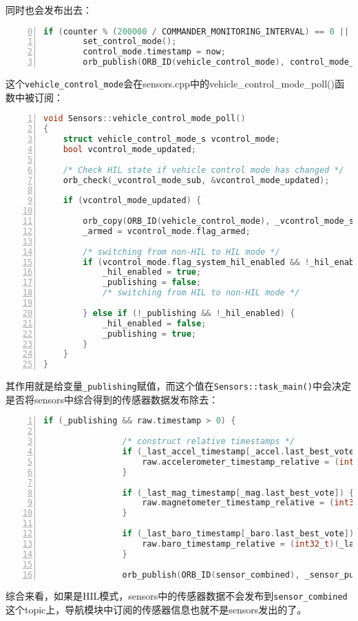 同时也会发布出去：
\begin{lstlisting}[language=C++,numbers=left,firstnumber = 0,breaklines = true,numberstyle=\tiny,keywordstyle=\color{blue!70},commentstyle=\color{red!50!green!50!blue!50},frame=shadowbox, rulesepcolor=\color{red!20!green!20!blue!20}]
	if (counter % (200000 / COMMANDER_MONITORING_INTERVAL) == 0 || status_changed) {
		set_control_mode();
		control_mode.timestamp = now;
		orb_publish(ORB_ID(vehicle_control_mode), control_mode_pub, &control_mode);
\end{lstlisting}
这个\texttt{vehicle_control_mode}会在sensors.cpp中的vehicle_control_mode_poll()函数中被订阅：
\begin{lstlisting}[language=C++,numbers=left,firstnumber = 1,breaklines = true,numberstyle=\tiny,keywordstyle=\color{blue!70},commentstyle=\color{red!50!green!50!blue!50},frame=shadowbox, rulesepcolor=\color{red!20!green!20!blue!20}]
void Sensors::vehicle_control_mode_poll()
{
	struct vehicle_control_mode_s vcontrol_mode;
	bool vcontrol_mode_updated;

	/* Check HIL state if vehicle control mode has changed */
	orb_check(_vcontrol_mode_sub, &vcontrol_mode_updated);

	if (vcontrol_mode_updated) {

		orb_copy(ORB_ID(vehicle_control_mode), _vcontrol_mode_sub, &vcontrol_mode);
		_armed = vcontrol_mode.flag_armed;

		/* switching from non-HIL to HIL mode */
		if (vcontrol_mode.flag_system_hil_enabled && !_hil_enabled) {
			_hil_enabled = true;
			_publishing = false;
			/* switching from HIL to non-HIL mode */

		} else if (!_publishing && !_hil_enabled) {
			_hil_enabled = false;
			_publishing = true;
		}
	}
}
\end{lstlisting}
其作用就是给变量\texttt{_publishing}赋值，而这个值在\texttt{Sensors::task_main()}中会决定是否将sensors中综合得到的传感器数据发布除去：
\begin{lstlisting}[language=C++,numbers=left,firstnumber = 1,breaklines = true,numberstyle=\tiny,keywordstyle=\color{blue!70},commentstyle=\color{red!50!green!50!blue!50},frame=shadowbox, rulesepcolor=\color{red!20!green!20!blue!20}]
if (_publishing && raw.timestamp > 0) {
	
				/* construct relative timestamps */
				if (_last_accel_timestamp[_accel.last_best_vote]) {
					raw.accelerometer_timestamp_relative = (int32_t)(_last_accel_timestamp[_accel.last_best_vote] - raw.timestamp);
				}
	
				if (_last_mag_timestamp[_mag.last_best_vote]) {
					raw.magnetometer_timestamp_relative = (int32_t)(_last_mag_timestamp[_mag.last_best_vote] - raw.timestamp);
				}
	
				if (_last_baro_timestamp[_baro.last_best_vote]) {
					raw.baro_timestamp_relative = (int32_t)(_last_baro_timestamp[_baro.last_best_vote] - raw.timestamp);
				}
	
				orb_publish(ORB_ID(sensor_combined), _sensor_pub, &raw);
\end{lstlisting}
综合来看，如果是HIL模式，sensors中的传感器数据不会发布到\texttt{sensor_combined}这个topic上，导航模块中订阅的传感器信息也就不是sensors发出的了。

